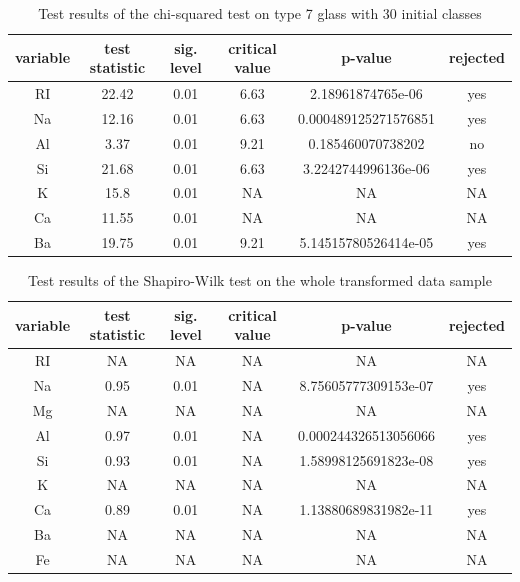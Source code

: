 \documentclass[a4paper, 12pt, titlepage, headsepline, listof = totoc, bibliography = totoc, numbers = noenddot]{scrartcl}
\begin{document}
\begin{appendix}
\begin{table}[h!]
\centering
\begin{tabular}{|cccccc|} \hline variable & test statistic & sig. level & critical value & p-value & rejected\\ \hline RI & 22.42 & 0.01 & 6.63 & 2.18961874765e-06 & yes\\ 
Na & 12.16 & 0.01 & 6.63 & 0.000489125271576851 & yes\\ 
Al & 3.37 & 0.01 & 9.21 & 0.185460070738202 & no\\ 
Si & 21.68 & 0.01 & 6.63 & 3.2242744996136e-06 & yes\\ 
K & 15.8 & 0.01 & NA & NA & NA\\ 
Ca & 11.55 & 0.01 & NA & NA & NA\\ 
Ba & 19.75 & 0.01 & 9.21 & 5.14515780526414e-05 & yes\\ \hline \end{tabular}\caption{Test results of the chi-squared test on type 7 glass with 30 initial classes}
\label{tab:chi-type7-30}
\end{table}

\begin{table}[h!]
\centering
\begin{tabular}{|cccccc|} \hline variable & test statistic & sig. level & critical value & p-value & rejected\\ \hline RI & NA & NA & NA & NA & NA\\ 
Na & 0.95 & 0.01 & NA & 8.75605777309153e-07 & yes\\ 
Mg & NA & NA & NA & NA & NA\\ 
Al & 0.97 & 0.01 & NA & 0.000244326513056066 & yes\\ 
Si & 0.93 & 0.01 & NA & 1.58998125691823e-08 & yes\\ 
K & NA & NA & NA & NA & NA\\ 
Ca & 0.89 & 0.01 & NA & 1.13880689831982e-11 & yes\\ 
Ba & NA & NA & NA & NA & NA\\ 
Fe & NA & NA & NA & NA & NA\\ \hline \end{tabular}\caption{Test results of the Shapiro-Wilk test on the whole transformed data sample}
\label{tab:testresFullSWtrans}
\end{table}


\end{appendix}
\end{document}
